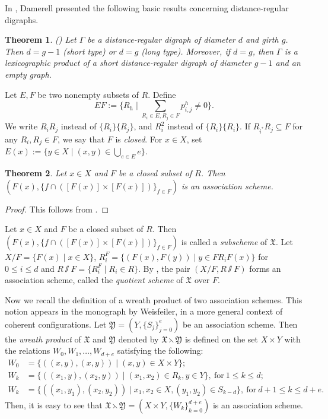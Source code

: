 \documentclass[12pt,a4paper]{amsart}
\newtheorem{thm}{Theorem}[section]
\theoremstyle{definition}
\begin{document}
In \cite{RMD81}, Damerell  presented the following basic results concerning distance-regular digraphs.

\begin{thm}\label{drdg}
{\rm (\cite[Theorems 2 and 4]{RMD81})} Let $\Gamma$ be a distance-regular digraph of diameter $d$ and girth $g$. Then $d=g-1$ (short type) or $d=g$ (long type). Moreover, if $d=g$, then $\Gamma$ is a lexicographic product of a short distance-regular digraph of diameter $g-1$ and an empty graph.
\end{thm}

Let $E,F$ be two nonempty subsets of $R$. Define
$$EF:=\{R_{h}\mid\underset{R_i\in E, R_j\in F}{\sum}p_{i,j}^{h}\neq0\}.$$
We write $R_iR_j$ instead of $\{R_i\}\{R_j\}$, and $R^{2}_i$ instead of $\{R_i\}\{R_i\}$. If $R_{i^*}R_j\subseteq F$ for any $R_i, R_j\in F$, we say that $F$ is \emph{closed}. For $x\in X$, set $E(x):=\{y\in X\mid (x,y)\in \bigcup_{e\in E}e\}$.

\begin{thm} \label{th2.3}
Let $x\in X$ and $F$ be a closed subset of $R$. Then $(F(x),\{f\cap([F(x)]\times [F(x)])\}_{f\in F})$ is an association scheme.
\end{thm}
\begin{proof}
	This follows from \cite[Theorem 1.5.1 (ii)]{PHZ96}.
\end{proof}
Let $x\in X$ and $F$ be a closed subset of $R$. Then $(F(x),\{f\cap([F(x)]\times [F(x)])\}_{f\in F})$ is called a \emph{subscheme} of $\mathfrak{X}$. Let $X/F=\{ F(x) \mid x\in X\}$, $R_i^F=\{(F(x),F(y))\mid y\in FR_iF(x)\}$  for $0\leq i\leq d$ and $R \sslash F=\{R_i^F\mid R_i\in R\}$. By \cite[Theorem 4.1.3 (i)]{PHZ05}, the pair $(X/F, R \sslash F)$ forms an association scheme, called the \emph{quotient scheme} of $\mathfrak{X}$ over $F$.

Now we recall the definition of a wreath product of two association schemes. This notion appears in the monograph \cite{We76} by Weisfeiler, in a more general context of coherent configurations. Let $\mathfrak{Y}=(Y,\{S_j\}_{j=0}^e)$ be an association scheme. Then the \emph{wreath product} of $\mathfrak{X}$ and $\mathfrak{Y}$ denoted by $\mathfrak{X}  \leftthreetimes \mathfrak{Y}$ is defined on the set $X\times Y$ with the relations $W_0, W_1,\ldots, W_{d+e}$ satisfying the following:
\begin{align}
W_0&=\{((x,y),(x,y))\mid (x,y)\in X\times Y\};\nonumber\\
W_k&=\{((x_1,y),(x_2,y))\mid (x_1,x_2)\in R_k, y\in Y\},~\mbox{for}~ 1\leq k\leq d; \nonumber\\
W_k&=\{((x_1,y_1),(x_2,y_2))\mid x_1,x_2\in X, (y_1,y_2)\in S_{k-d}\}, ~\mbox{for}~ d+1\leq k\leq d+e.\nonumber
\end{align}
Then, it is easy to see that $\mathfrak{X}  \leftthreetimes \mathfrak{Y}=(X\times Y,\{W_k\}_{k=0}^{d+e})$ is an association scheme.
\end{document}
